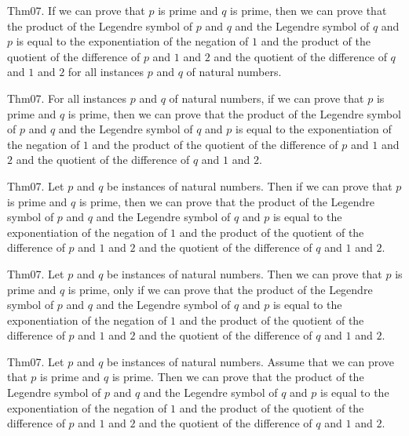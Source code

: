 \documentclass{article}
\begin{document}
Thm07. If we can prove that $p$ is prime and $q$ is prime, then we can prove that the product of the Legendre symbol of $p$ and $q$ and the Legendre symbol of $q$ and $p$ is equal to the exponentiation of the negation of $1$ and the product of the quotient of the difference of $p$ and $1$ and $2$ and the quotient of the difference of $q$ and $1$ and $2$ for all instances $p$ and $q$ of natural numbers.

Thm07. For all instances $p$ and $q$ of natural numbers, if we can prove that $p$ is prime and $q$ is prime, then we can prove that the product of the Legendre symbol of $p$ and $q$ and the Legendre symbol of $q$ and $p$ is equal to the exponentiation of the negation of $1$ and the product of the quotient of the difference of $p$ and $1$ and $2$ and the quotient of the difference of $q$ and $1$ and $2$.

Thm07. Let $p$ and $q$ be instances of natural numbers. Then if we can prove that $p$ is prime and $q$ is prime, then we can prove that the product of the Legendre symbol of $p$ and $q$ and the Legendre symbol of $q$ and $p$ is equal to the exponentiation of the negation of $1$ and the product of the quotient of the difference of $p$ and $1$ and $2$ and the quotient of the difference of $q$ and $1$ and $2$.

Thm07. Let $p$ and $q$ be instances of natural numbers. Then we can prove that $p$ is prime and $q$ is prime, only if we can prove that the product of the Legendre symbol of $p$ and $q$ and the Legendre symbol of $q$ and $p$ is equal to the exponentiation of the negation of $1$ and the product of the quotient of the difference of $p$ and $1$ and $2$ and the quotient of the difference of $q$ and $1$ and $2$.

Thm07. Let $p$ and $q$ be instances of natural numbers. Assume that we can prove that $p$ is prime and $q$ is prime. Then we can prove that the product of the Legendre symbol of $p$ and $q$ and the Legendre symbol of $q$ and $p$ is equal to the exponentiation of the negation of $1$ and the product of the quotient of the difference of $p$ and $1$ and $2$ and the quotient of the difference of $q$ and $1$ and $2$.
\end{document}
